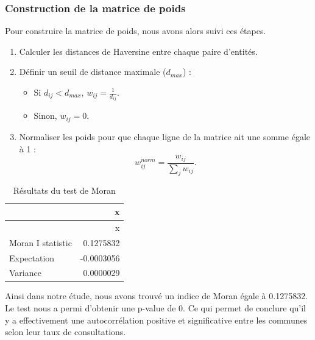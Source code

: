 \subsubsection{Construction de la matrice de
poids}\label{construction-de-la-matrice-de-poids}

\hfill\break
Pour construire la matrice de poids, nous avons alors suivi ces
étapes.\\

\begin{enumerate}
\def\labelenumi{\arabic{enumi}.}
\tightlist
\item
  Calculer les distances de Haversine entre chaque paire d'entités.
\item
  Définir un seuil de distance maximale (\(d_{max}\)) :

  \begin{itemize}
  \tightlist
  \item
    Si \(d_{ij} < d_{max}\), \(w_{ij} = \frac{1}{d_{ij}}\).
  \item
    Sinon, \(w_{ij} = 0\).
  \end{itemize}
\item
  Normaliser les poids pour que chaque ligne de la matrice ait une somme
  égale à 1 : \[
   w_{ij}^{norm} = \frac{w_{ij}}{\sum_{j} w_{ij}}.
  \]
\end{enumerate}

\begin{longtable}[]{@{}lr@{}}
\caption{Résultats du test de Moran}\tabularnewline
\toprule\noalign{}
& x \\
\midrule\noalign{}
\endfirsthead
\toprule\noalign{}
& x \\
\midrule\noalign{}
\endhead
\bottomrule\noalign{}
\endlastfoot
Moran I statistic & 0.1275832 \\
Expectation & -0.0003056 \\
Variance & 0.0000029 \\
\end{longtable}

Ainsi dans notre étude, nous avons trouvé un indice de Moran égale à
0.1275832. Le test nous a permi d'obtenir une p-value de 0. Ce qui
permet de conclure qu'il y a effectivement une autocorrélation positive
et significative entre les communes selon leur taux de consultations.

